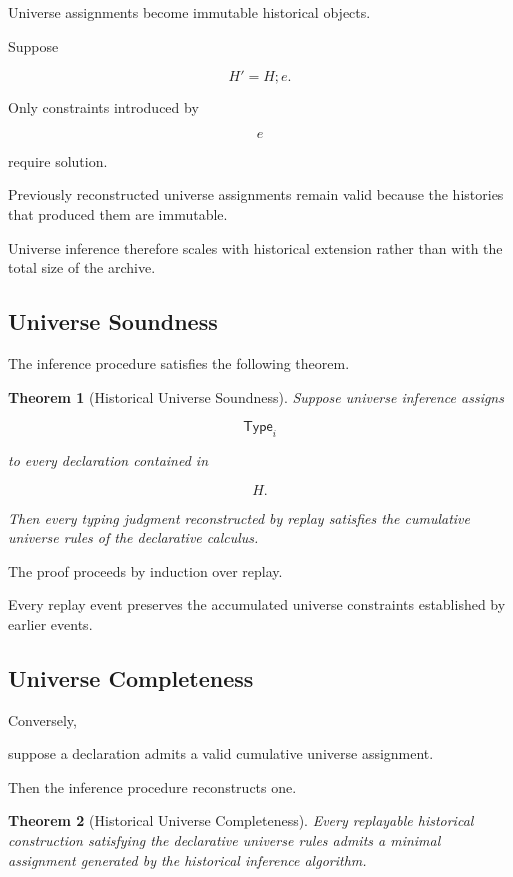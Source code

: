 \documentclass[12pt,oneside]{article}
\newtheorem{theorem}{Theorem}[section]
\theoremstyle{definition}
\theoremstyle{remark}
\newcommand{\Type}{\mathsf{Type}}
\begin{document}
Universe assignments become immutable historical objects.

Suppose

\[
H'
=
H;
e.
\]

Only constraints introduced by

\[
e
\]

require solution.

Previously reconstructed universe assignments remain valid because the histories
that produced them are immutable.

Universe inference therefore scales with historical extension rather than with
the total size of the archive.


\subsection{Universe Soundness}

The inference procedure satisfies the following theorem.

\begin{theorem}[Historical Universe Soundness]

Suppose universe inference assigns

\[
\Type_i
\]

to every declaration contained in

\[
H.
\]

Then every typing judgment reconstructed by replay satisfies the cumulative
universe rules of the declarative calculus.

\end{theorem}

The proof proceeds by induction over replay.

Every replay event preserves the accumulated universe constraints established by
earlier events.


\subsection{Universe Completeness}

Conversely,

suppose a declaration admits a valid cumulative universe assignment.

Then the inference procedure reconstructs one.

\begin{theorem}[Historical Universe Completeness]

Every replayable historical construction satisfying the declarative universe
rules admits a minimal assignment generated by the historical inference
algorithm.

\end{theorem}
\end{document}
